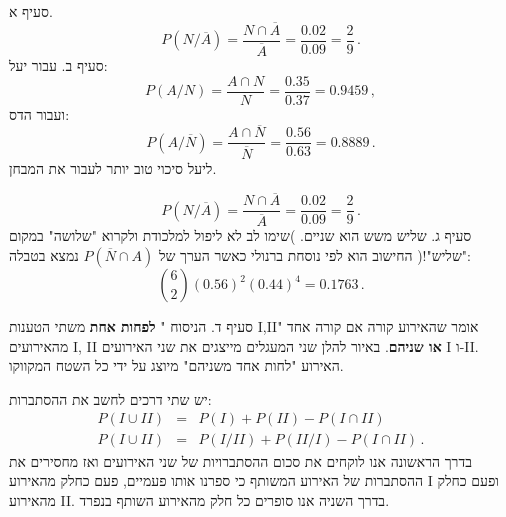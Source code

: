 \documentclass[12pt,a4paper]{article}
\begin{document}
סעיף א.
\[
P(N/\overline{A})=\frac{N\cap \overline{A}}{\overline{A}}=\frac{0.02}{0.09}=\frac{2}{9}\,.
\]
סעיף ב. עבור יעל:
\[
P(A/N)=\frac{A \cap N}{N}=\frac{0.35}{0.37}=0.9459\,,
\]
ועבור הדס:
\[
P(A/\overline{N})=\frac{A\cap \overline{N}}{\overline{N}}=\frac{0.56}{0.63}=0.8889\,.
\]
ליעל סיכוי טוב יותר לעבור את המבחן.

\[
P(N/\overline{A})=\frac{N\cap \overline{A}}{\overline{A}}=\frac{0.02}{0.09}=\frac{2}{9}\,.
\]
סעיף ג. שליש משש הוא שניים. )שימו לב לא ליפול למלכודת ולקרוא "שלושה" במקום "שליש"!( החישוב הוא לפי נוסחת ברנולי כאשר הערך של
$P(\overline{N}\cap A)$
נמצא בטבלה:
\[
{6 \choose 2}(0.56)^2 (0.44)^4=0.1763\,.
\]

סעיף ד. הניסוח "%
\textbf{לפחות אחת}
משתי הטענות I,II" אומר שהאירוע קורה אם קורה אחד מהאירועים I, II
\textbf{או שניהם}.
באיור להלן שני המעגלים מייצגים את שני האירועים I ו-II. האירוע "לחות אחד משניהם" מיוצג על ידי כל השטח המקווקו.
\begin{center}
\end{center}
 יש שתי דרכים לחשב את ההסתברות:
\begin{eqnarray*}
P(I \cup II) &=& P(I) + P(II) - P(I \cap II)\\
P(I \cup II) &=& P(I/ II) + P(II/ I) - P(I \cap II)\,.
\end{eqnarray*}
בדרך הראשונה אנו לוקחים את סכום ההסתברויות של שני האירועים ואז מחסירים את ההסתברות של האירוע המשותף כי ספרנו אותו פעמיים, פעם כחלק מהאירוע I ופעם כחלק מהאירוע II. בדרך השניה אנו סופרים כל חלק מהאירוע השותף בנפרד.
\end{document}
